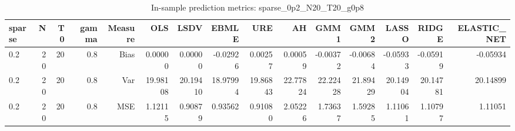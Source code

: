 \begin{table}[!htbp]\centering
\caption{In-sample prediction metrics: sparse_0p2_N20_T20_g0p8}
\label{tab:table2_sparse_0p2_N20_T20_g0p8}
\begin{tabular}{lrrrrrrrrrrrrrr}
\hline
sparse & N & T0 & gamma & Measure & OLS & LSDV & EBMLE & URE & AH & GMM1 & GMM2 & LASSO & RIDGE & ELASTIC_NET \\
\hline
0.2 & 20 & 20 & 0.8 & Bias & 0.00000 & 0.00000 & -0.02926 & 0.00257 & 0.00059 & -0.00372 & -0.00684 & -0.05933 & -0.05919 & -0.05934 \\
0.2 & 20 & 20 & 0.8 & Var & 19.98108 & 20.19410 & 18.97994 & 19.86843 & 22.77824 & 22.22428 & 21.89429 & 20.14904 & 20.14781 & 20.14899 \\
0.2 & 20 & 20 & 0.8 & MSE & 1.12115 & 0.90879 & 0.93562 & 0.91080 & 2.05226 & 1.73637 & 1.59285 & 1.11061 & 1.10797 & 1.11051 \\
\hline
\end{tabular}
\end{table}

